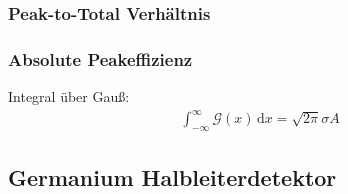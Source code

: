 \documentclass[11pt, a4paper]{article}
\numberwithin{equation}{section}
\begin{document}
\subsubsection{Peak-to-Total Verhältnis}

\subsubsection{Absolute Peakeffizienz}
Integral über Gauß:
\begin{align}
	\int_{-\infty}^{\infty} \mathcal{G}(x) \, \mathrm{d}x = \sqrt{2 \pi} \sigma A
\end{align}



\subsection{Germanium Halbleiterdetektor}
\end{document}
